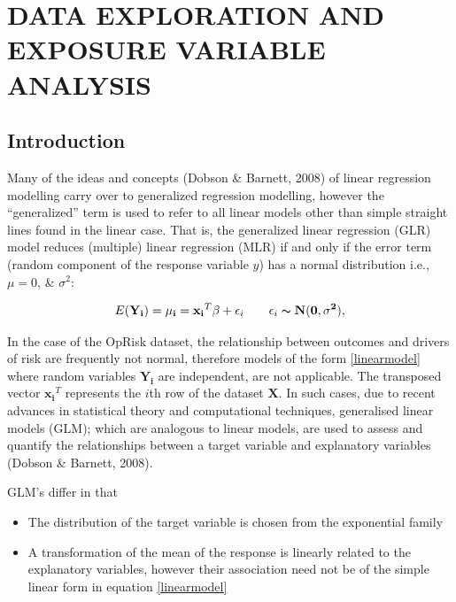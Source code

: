 \documentclass{DissertateUSU}
\begin{document}
\singlespacing

\FloatBarrier
\newpage
{}
\fancyhead[R]{\thepage}
\fancyfoot[C]{}

\chapter{DATA EXPLORATION AND EXPOSURE VARIABLE ANALYSIS}
\label{DATA EXPLORATION AND EXPOSURE VARIABLE ANALYSIS}

\doublespacing

\section{Introduction}
\label{sec4:Introduction}

Many of the ideas and concepts (Dobson \& Barnett, 2008) of linear
regression modelling carry over to generalized regression modelling,
however the ``generalized'' term is used to refer to all linear models
other than simple straight lines found in the linear case. That is, the
generalized linear regression (GLR) model reduces (multiple) linear
regression (MLR) if and only if the error term (random component of the
response variable \(y\)) has a normal distribution i.e., \(\mu = 0\), \&
\(\sigma^2\):

\singlespacing

\begin{eqnarray}\label{linearmodel}
E(\mathbf{Y_i}) = \mathbf{\mu_i} = \mathbf{x_i}^T\mathbf{\beta} + \epsilon_i \qquad \epsilon_i \thicksim \mathbf{N(0, \sigma^2)},
\end{eqnarray} \doublespacing

In the case of the OpRisk dataset, the relationship between outcomes and
drivers of risk are frequently not normal, therefore models of the form
\ref{linearmodel} where random variables \(\mathbf{Y_i}\) are
independent, are not applicable. The transposed vector
\(\mathbf{x_i}^T\) represents the \(i\)th row of the dataset
\(\mathbf{X}\). In such cases, due to recent advances in statistical
theory and computational techniques, generalised linear models (GLM);
which are analogous to linear models, are used to assess and quantify
the relationships between a target variable and explanatory variables
(Dobson \& Barnett, 2008).\medskip

GLM's differ in that

\begin{itemize}
\item The distribution of the target variable is chosen from the exponential family
\item A transformation of the mean of the response is linearly related to the explanatory variables, however their association need not be of the simple linear form in equation \ref{linearmodel}
\end{itemize}
\medskip
\end{document}
